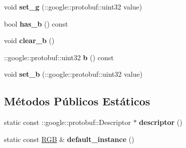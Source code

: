 \begin{DoxyCompactItemize}
\item 
void {\bfseries set\+\_\+g} (\+::google\+::protobuf\+::uint32 value)\hypertarget{classvss__state_1_1RGB_a353c8a4e1ff0d19c5a093b910797c7b9}{}\label{classvss__state_1_1RGB_a353c8a4e1ff0d19c5a093b910797c7b9}

\item 
bool {\bfseries has\+\_\+b} () const \hypertarget{classvss__state_1_1RGB_ad56ba40a1f62f12c828f60042dde4121}{}\label{classvss__state_1_1RGB_ad56ba40a1f62f12c828f60042dde4121}

\item 
void {\bfseries clear\+\_\+b} ()\hypertarget{classvss__state_1_1RGB_a3b8c5f9250f44c8d0f987bcf10abdc64}{}\label{classvss__state_1_1RGB_a3b8c5f9250f44c8d0f987bcf10abdc64}

\item 
\+::google\+::protobuf\+::uint32 {\bfseries b} () const \hypertarget{classvss__state_1_1RGB_ac59c6fa5dafec18a115e3a00cd1fa68e}{}\label{classvss__state_1_1RGB_ac59c6fa5dafec18a115e3a00cd1fa68e}

\item 
void {\bfseries set\+\_\+b} (\+::google\+::protobuf\+::uint32 value)\hypertarget{classvss__state_1_1RGB_a3977bb063a529efca387875a69a5b465}{}\label{classvss__state_1_1RGB_a3977bb063a529efca387875a69a5b465}

\end{DoxyCompactItemize}
\subsection*{Métodos Públicos Estáticos}
\begin{DoxyCompactItemize}
\item 
static const \+::google\+::protobuf\+::\+Descriptor $\ast$ {\bfseries descriptor} ()\hypertarget{classvss__state_1_1RGB_a64df354aa51e9fb966ee23e03a5e9329}{}\label{classvss__state_1_1RGB_a64df354aa51e9fb966ee23e03a5e9329}

\item 
static const \hyperlink{classvss__state_1_1RGB}{R\+GB} \& {\bfseries default\+\_\+instance} ()\hypertarget{classvss__state_1_1RGB_a82e155d80791f80c397423d539f03614}{}\label{classvss__state_1_1RGB_a82e155d80791f80c397423d539f03614}

\end{DoxyCompactItemize}
